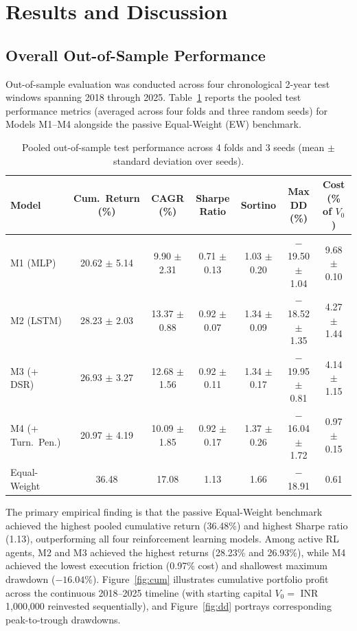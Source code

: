 \documentclass[11pt,a4paper]{article}
\numberwithin{equation}{section}
\numberwithin{table}{section}
\numberwithin{figure}{section}
\numberwithin{algorithm}{section}
\begin{document}
\section{Results and Discussion}\label{ch:results}
\subsection{Overall Out-of-Sample Performance}
Out-of-sample evaluation was conducted across four chronological 2-year test windows spanning 2018 through 2025. Table~\ref{tab:overall} reports the pooled test performance metrics (averaged across four folds and three random seeds) for Models M1--M4 alongside the passive Equal-Weight (EW) benchmark.

\begin{table}[!htbp]
\centering\footnotesize
\caption{Pooled out-of-sample test performance across 4 folds and 3 seeds (mean $\pm$ standard deviation over seeds).}\label{tab:overall}
\setlength{\tabcolsep}{2.6pt}
\begin{tabular}{@{}lcccccc@{}}
\toprule
Model & Cum.\ Return (\%) & CAGR (\%) & Sharpe Ratio & Sortino & Max DD (\%) & Cost (\% of $V_0$)\\
\midrule
M1 (MLP) & 20.62 $\pm$ 5.14 & 9.90 $\pm$ 2.31 & 0.71 $\pm$ 0.13 & 1.03 $\pm$ 0.20 & $-$19.50 $\pm$ 1.04 & 9.68 $\pm$ 0.10\\
M2 (LSTM) & 28.23 $\pm$ 2.03 & 13.37 $\pm$ 0.88 & 0.92 $\pm$ 0.07 & 1.34 $\pm$ 0.09 & $-$18.52 $\pm$ 1.35 & 4.27 $\pm$ 1.44\\
M3 (+ DSR) & 26.93 $\pm$ 3.27 & 12.68 $\pm$ 1.56 & 0.92 $\pm$ 0.11 & 1.34 $\pm$ 0.17 & $-$19.95 $\pm$ 0.81 & 4.14 $\pm$ 1.15\\
M4 (+ Turn.\ Pen.) & 20.97 $\pm$ 4.19 & 10.09 $\pm$ 1.85 & 0.92 $\pm$ 0.17 & 1.37 $\pm$ 0.26 & $-$16.04 $\pm$ 1.72 & 0.97 $\pm$ 0.15\\
Equal-Weight & 36.48 & 17.08 & 1.13 & 1.66 & $-$18.91 & 0.61\\
\bottomrule
\end{tabular}
\end{table}

The primary empirical finding is that the passive Equal-Weight benchmark achieved the highest pooled cumulative return (36.48\%) and highest Sharpe ratio (1.13), outperforming all four reinforcement learning models. Among active RL agents, M2 and M3 achieved the highest returns (28.23\% and 26.93\%), while M4 achieved the lowest execution friction (0.97\% cost) and shallowest maximum drawdown ($-16.04\%$). Figure~\ref{fig:cum} illustrates cumulative portfolio profit across the continuous 2018--2025 timeline (with starting capital $V_0=$ INR 1,000,000 reinvested sequentially), and Figure~\ref{fig:dd} portrays corresponding peak-to-trough drawdowns.
\end{document}
